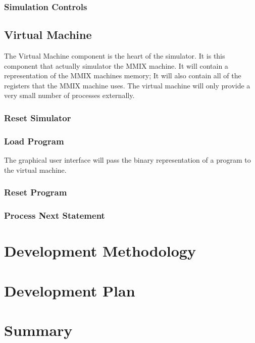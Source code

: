 \documentclass[11pt]{article} %
\begin{document}
\subsubsection{Simulation Controls}

\subsection{Virtual Machine}
%
The Virtual Machine component is the heart of the simulator.  It is this component that actually simulator the MMIX machine.  It will contain a representation of the MMIX machines memory; It will also contain all of the registers that the MMIX machine uses.  The virtual machine will only provide a very small number of processes externally.   
\subsubsection{Reset Simulator}
\subsubsection{Load Program}
The graphical user interface will pass the binary representation of a program to the virtual machine.
\subsubsection{Reset Program}
\subsubsection{Process Next Statement}


\section{Development Methodology}


\section{Development Plan}


\section{Summary}
\end{document}
